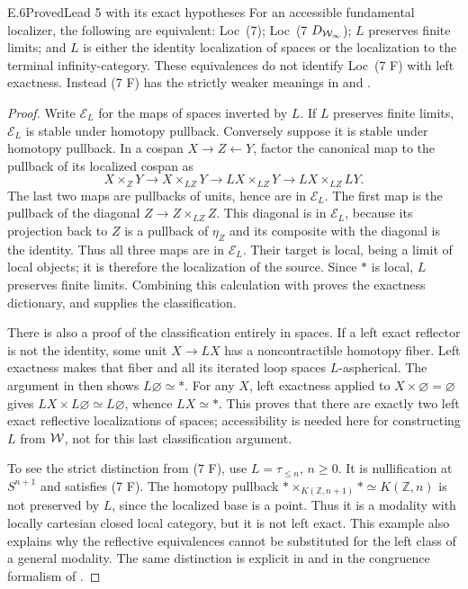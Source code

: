 \begin{claim}{E.6}{Proved}{Lead 5 with its exact hypotheses}
For an accessible fundamental localizer, the following are
equivalent: Loc~(7); Loc~(7 $D_{\mathcal{W}_{\infty}}$); $L$ preserves
finite limits; and $L$ is either the identity localization of
spaces or the localization to the terminal infinity-category.
These equivalences do not identify Loc~(7 F) with left
exactness. Instead (7 F) has the strictly weaker meanings
in  and .
\end{claim}
\begin{proof}
Write $\mathcal E_L$ for the maps of spaces inverted by $L$.
If $L$ preserves finite limits, $\mathcal E_L$ is stable
under homotopy pullback. Conversely suppose it is stable
under homotopy pullback. In a cospan $X\to Z\leftarrow Y$,
factor the canonical map to the pullback of its localized
cospan as
\[
 X\times_ZY\longrightarrow X\times_{LZ}Y
 \longrightarrow LX\times_{LZ}Y
 \longrightarrow LX\times_{LZ}LY.
\]
The last two maps are pullbacks of units, hence are in
$\mathcal E_L$. The first map is the pullback of the diagonal
$Z\to Z\times_{LZ}Z$. This diagonal is in
$\mathcal E_L$, because its projection back to $Z$ is a
pullback of $\eta_Z$ and its composite with the diagonal
is the identity. Thus all three maps are in
$\mathcal E_L$. Their target is local, being a limit of local
objects; it is therefore the localization of the source.
Since $*$ is local, $L$ preserves finite limits. Combining
this calculation with  proves the exactness
dictionary, and  supplies the classification.

There is also a proof of the classification entirely in
spaces. If a left exact reflector is not the identity, some
unit $X\to LX$ has a noncontractible homotopy fiber. Left
exactness makes that fiber and all its iterated loop spaces
$L$-aspherical. The argument in  then shows
$L\varnothing\simeq*$. For any $X$, left exactness applied
to $X\times\varnothing=\varnothing$ gives
$LX\times L\varnothing\simeq L\varnothing$, whence
$LX\simeq*$. This proves that there are exactly two left
exact reflective localizations of spaces; accessibility is
needed here for constructing $L$ from $\mathcal{W}$, not for this
last classification argument.

To see the strict distinction from (7 F), use
$L=\tau_{\leq n}$, $n\geq0$. It is nullification at
$S^{n+1}$ and satisfies (7 F). The homotopy pullback
$*\times_{K(\mathbb Z,n+1)}*\simeq K(\mathbb Z,n)$
is not preserved by $L$, since the localized base is a point.
Thus it is a modality with locally cartesian closed local
category, but it is not left exact. This example also
explains why the reflective equivalences cannot be substituted
for the left class of a general modality. The same distinction
is explicit in \citet[Theorem 3.1 and the discussion after
Corollary 3.9]{CERijkeShulmanSpitters2020} and in the congruence
formalism of \citet{CEAnelEtAl2022}.
\end{proof}

